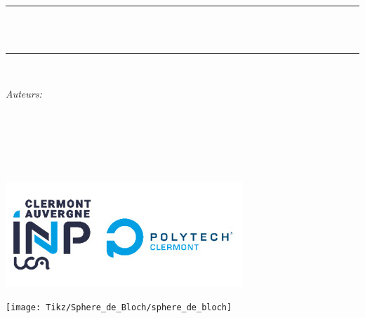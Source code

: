 
\begin{titlepage}
	\newcommand{\HRule}{\rule{\linewidth}{0.5mm}}
	\centering 
	\quad\\[1.5cm]
	
	
	\makeatletter
	\HRule \\[0.4cm]
	{ \huge \bfseries \@title}\\[0.4cm] 
	\HRule \\[1.5cm]
	\begin{minipage}{0.4\textwidth}
		\begin{flushleft} \large
			\emph{Auteurs:}\\
			\@author 
		\end{flushleft}
	\end{minipage}
	~
	\begin{minipage}{0.4\textwidth}
		\begin{flushright} \large
			\emph{} \\
			\textup{}
		\end{flushright}
	\end{minipage}\\[1cm]
	\makeatother	
	
	\includegraphics[width=0.4\linewidth]{Premier_page/polytech_1}
	
	
	
	
	\vspace{2cm}
	


	\texttt{[image: Tikz/Sphere\_de\_Bloch/sphere\_de\_bloch]}




	
	
	
	
	
	
	
	
	
	
	\vfill 
	
\end{titlepage}

